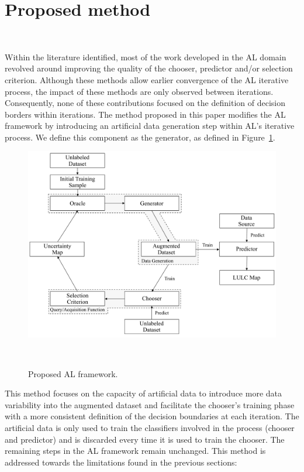 \documentclass[parskip=full]{scrartcl}
\begin{document}
\section{Proposed method}~\label{sec:proposed-method}

Within the literature identified, most of the work developed in the AL domain
revolved around improving the quality of the chooser, predictor and/or selection
criterion. Although these methods allow earlier convergence of the AL iterative
process, the impact of these methods are only observed between iterations.
Consequently, none of these contributions focused on the definition of decision
borders within iterations. The method proposed in this paper modifies the AL
framework by introducing an artificial data generation step within AL's
iterative process. We define this component as the generator, as defined in
Figure~\ref{fig:al_new}. 

\begin{figure}[H]
	\centering
	\includegraphics[width=.85\linewidth]{../analysis/al_new}
	\caption{Proposed AL framework.
    }~\label{fig:al_new}
\end{figure}

This method focuses on the capacity of artificial data to introduce more data
variability into the augmented dataset and facilitate the chooser's training
phase with a more consistent definition of the decision boundaries at each
iteration. The artificial data is only used to train the classifiers involved in
the process (chooser and predictor) and is discarded every time it is used to
train the chooser. The remaining steps in the AL framework remain unchanged.
This method is addressed towards the limitations found in the previous sections: 
\end{document}
